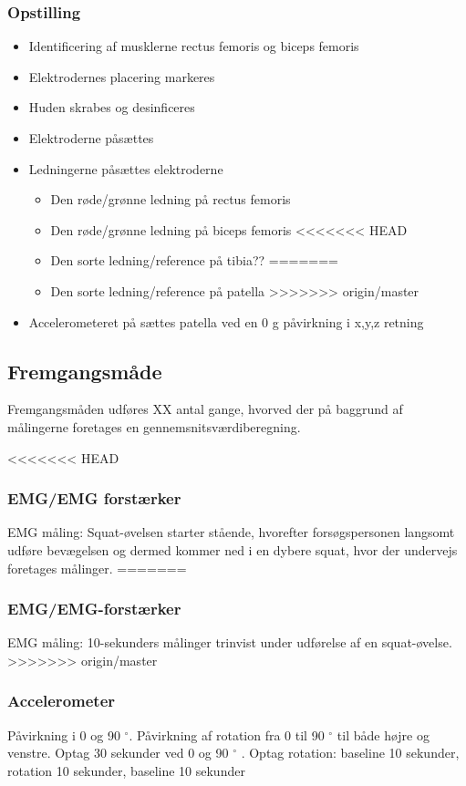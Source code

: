 \subsubsection{Opstilling}
\begin{itemize}
\item Identificering af musklerne rectus femoris og biceps femoris 
\item Elektrodernes placering markeres
\item Huden skrabes og desinficeres
\item Elektroderne påsættes
\item Ledningerne påsættes elektroderne
\begin{itemize}
\item Den røde/grønne ledning på rectus femoris
\item Den røde/grønne ledning på biceps femoris
<<<<<<< HEAD
\item Den sorte ledning/reference på tibia??
=======
\item Den sorte ledning/reference på patella 
>>>>>>> origin/master
\end{itemize} 
\item Accelerometeret på sættes patella ved en 0 g påvirkning i x,y,z retning
\end{itemize}


\subsection{Fremgangsmåde}
Fremgangsmåden udføres XX antal gange, hvorved der på baggrund af målingerne foretages en gennemsnitsværdiberegning.

<<<<<<< HEAD
\subsubsection{EMG/EMG forstærker}
EMG måling: Squat-øvelsen starter stående, hvorefter forsøgspersonen langsomt udføre bevægelsen og dermed kommer ned i en dybere squat, hvor der undervejs foretages målinger.
=======
\subsubsection{EMG/EMG-forstærker}
EMG måling: 10-sekunders målinger trinvist under udførelse af en squat-øvelse. 
>>>>>>> origin/master

\subsubsection{Accelerometer}
Påvirkning i 0 og 90 $^{\circ}$.
Påvirkning af rotation fra 0 til 90 $^{\circ}$ til både højre og venstre.
Optag 30 sekunder ved 0 og 90 $^{\circ}$ .
Optag rotation: baseline 10 sekunder, rotation 10 sekunder, baseline 10 sekunder




